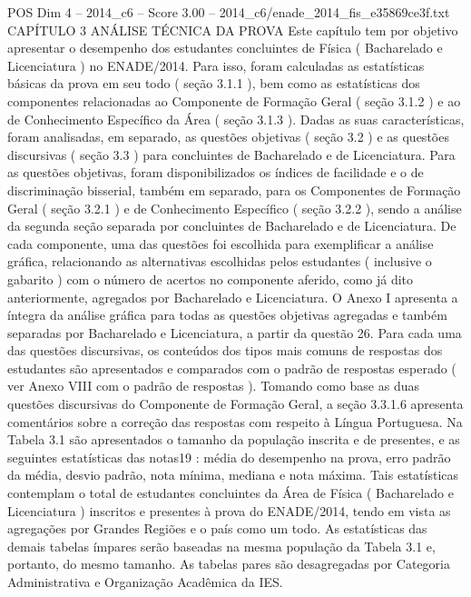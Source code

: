 \begin{textsample}{POS Dim 4 – 2014\_c6 – Score 3.00 – 2014\_c6/enade\_2014\_fis\_e35869ce3f.txt}  \label{ex:f4_pos_079}
CAPÍTULO 3 ANÁLISE TÉCNICA DA PROVA Este capítulo tem por objetivo apresentar o desempenho dos estudantes concluintes de Física ( Bacharelado e Licenciatura ) no ENADE/2014.
Para isso, foram calculadas as estatísticas básicas da prova em seu todo ( seção 3.1.1 ), bem como as estatísticas dos componentes relacionadas ao Componente de Formação Geral ( seção 3.1.2 ) e ao de Conhecimento Específico da Área ( seção 3.1.3 ).
Dadas as suas características, foram analisadas, em separado, as questões objetivas ( seção 3.2 ) e as questões discursivas ( seção 3.3 ) para concluintes de Bacharelado e de Licenciatura.
Para as questões objetivas, foram disponibilizados os índices de facilidade e o de discriminação bisserial, também em separado, para os Componentes de Formação Geral ( seção 3.2.1 ) e de Conhecimento Específico ( seção 3.2.2 ), sendo a análise da segunda seção separada por concluintes de Bacharelado e de Licenciatura.
De cada componente, uma das questões foi escolhida para exemplificar a análise gráfica, relacionando as alternativas escolhidas pelos estudantes ( inclusive o gabarito ) com o número de acertos no componente aferido, como já dito anteriormente, agregados por Bacharelado e Licenciatura.
O Anexo I apresenta a íntegra da análise gráfica para todas as questões objetivas agregadas e também separadas por Bacharelado e Licenciatura, a partir da questão 26.
Para cada uma das questões discursivas, os conteúdos dos tipos mais comuns de respostas dos estudantes são apresentados e comparados com o padrão de respostas esperado ( ver Anexo VIII com o padrão de respostas ).
Tomando como base as duas questões discursivas do Componente de Formação Geral, a seção 3.3.1.6 apresenta comentários sobre a correção das respostas com respeito à Língua Portuguesa.
Na Tabela 3.1 são apresentados o tamanho da população inscrita e de presentes, e as seguintes estatísticas das notas19 : média do desempenho na prova, erro padrão da média, desvio padrão, nota mínima, mediana e nota máxima.
Tais estatísticas contemplam o total de estudantes concluintes da Área de Física ( Bacharelado e Licenciatura ) inscritos e presentes à prova do ENADE/2014, tendo em vista as agregações por Grandes Regiões e o país como um todo.
As estatísticas das demais tabelas ímpares serão baseadas na mesma população da Tabela 3.1 e, portanto, do mesmo tamanho.
As tabelas pares são desagregadas por Categoria Administrativa e Organização Acadêmica da IES.

\end{textsample}
